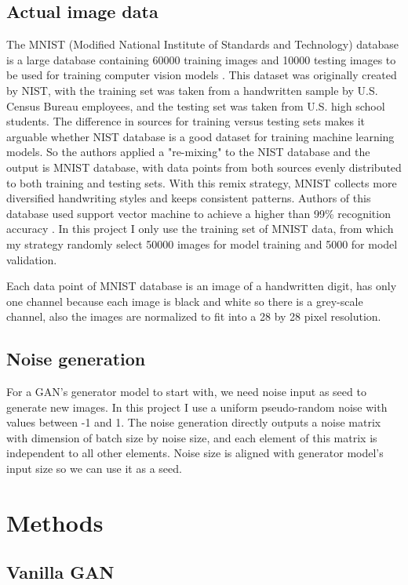\documentclass[10pt,twocolumn,letterpaper]{article}
\begin{document}
\subsection{Actual image data}
\label{actual_image}
The MNIST (Modified National Institute of Standards and Technology) database is a large database containing 60000 training images and 10000 testing images to be used for training computer vision models \cite{mnist}. This dataset was originally created by NIST, with the training set was taken from a handwritten sample by U.S. Census Bureau employees, and the testing set was taken from U.S. high school students. The difference in sources for training versus testing sets makes it arguable whether NIST database is a good dataset for training machine learning models. So the authors applied a "re-mixing" to the NIST database and the output is MNIST database, with data points from both sources evenly distributed to both training and testing sets. With this remix strategy, MNIST collects more diversified handwriting styles and keeps consistent patterns. Authors of this database used support vector machine to achieve a higher than 99\% recognition accuracy \cite{726791}. In this project I only use the training set of MNIST data, from which my strategy randomly select 50000 images for model training and 5000 for model validation. 

Each data point of MNIST database is an image of a handwritten digit, has only one channel because each image is black and white so there is a grey-scale channel, also the images are normalized to fit into a 28 by 28 pixel resolution.


\subsection{Noise generation}
\label{noise}
For a GAN's generator model to start with, we need noise input as seed to generate new images. In this project I use a uniform pseudo-random noise with values between -1 and 1. The noise generation directly outputs a noise matrix with dimension of batch size by noise size, and each element of this matrix is independent to all other elements. Noise size is aligned with generator model's input size so we can use it as a seed. 


\section{Methods}
\label{methods}
\subsection{Vanilla GAN}
\label{vanilla_gan}
\end{document}
